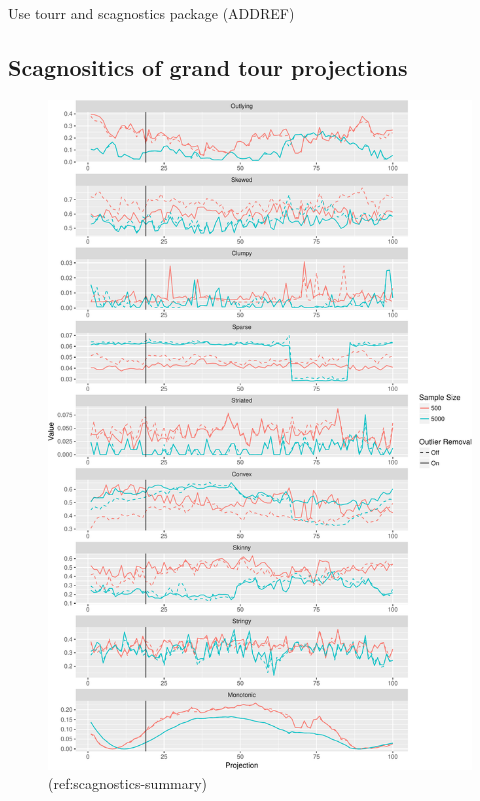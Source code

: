\documentclass[article]{jss}
\begin{document}
Use tourr and scagnostics package (ADDREF)

\subsection{Scagnositics of grand tour
projections}\label{scagnositics-of-grand-tour-projections}

\begin{CodeChunk}
\begin{figure}

{\centering \includegraphics[width=\textwidth]{figure/scagnostics-summary-1} 

}

\caption[(ref:scagnostics-summary)]{(ref:scagnostics-summary)}\label{fig:scagnostics-summary}
\end{figure}
\end{CodeChunk}
\end{document}
